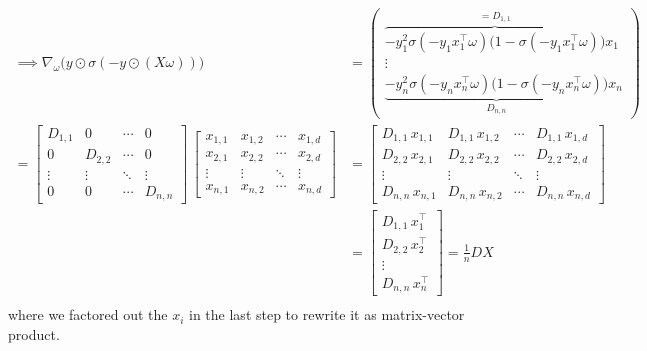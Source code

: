 \documentclass{article}
\begin{document}
\begin{align*}
\implies \nabla_\omega \big(y \odot \sigma(-y \odot (X\omega))\big) &= 
\begin{pmatrix}
 \overbrace{-y_1^2 \sigma(-y_1 x_1^\top \omega) \big(1 - \sigma(-y_1 x_1^\top \omega)\big)}^{=D_{1,1}} x_1 \\
 \vdots \\
 \underbrace{ -y_n^2 \sigma(-y_n x_n^\top \omega) \big(1 - \sigma(-y_n x_n^\top \omega)\big)}_{D_{n,n}} x_n
\end{pmatrix}\\
=
\begin{bmatrix}
D_{1,1} & 0       & \cdots & 0       \\
0       & D_{2,2} & \cdots & 0       \\
\vdots  & \vdots  & \ddots & \vdots  \\
0       & 0       & \cdots & D_{n,n}
\end{bmatrix}
\,
\begin{bmatrix}
x_{1,1} & x_{1,2} & \cdots & x_{1,d} \\
x_{2,1} & x_{2,2} & \cdots & x_{2,d} \\
\vdots  & \vdots  & \ddots & \vdots  \\
x_{n,1} & x_{n,2} & \cdots & x_{n,d}
\end{bmatrix} 
&=
\begin{bmatrix}
D_{1,1}\,x_{1,1} & D_{1,1}\,x_{1,2} & \cdots & D_{1,1}\,x_{1,d} \\
D_{2,2}\,x_{2,1} & D_{2,2}\,x_{2,2} & \cdots & D_{2,2}\,x_{2,d} \\
\vdots           & \vdots           & \ddots & \vdots           \\
D_{n,n}\,x_{n,1} & D_{n,n}\,x_{n,2} & \cdots & D_{n,n}\,x_{n,d}
\end{bmatrix} \\
&=
\begin{bmatrix}
D_{1,1}\,x_1^\top \\
D_{2,2}\,x_2^\top \\
\vdots           \\
D_{n,n}\,x_n^\top
\end{bmatrix}
= \frac{1}{n} D X\\
\end{align*}
where we factored out the $x_i$ in the last step to rewrite it as matrix-vector product.
\end{document}
